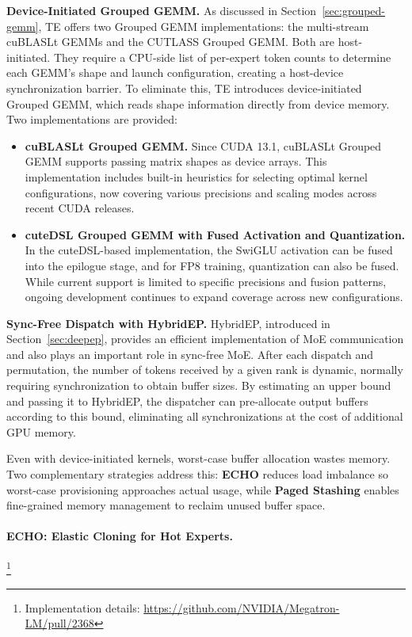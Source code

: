 \textbf{Device-Initiated Grouped GEMM.}
As discussed in Section~\ref{sec:grouped-gemm}, TE offers two Grouped GEMM implementations: the multi-stream cuBLASLt GEMMs and the CUTLASS Grouped GEMM. Both are host-initiated. They require a CPU-side list of per-expert token counts to determine each GEMM's shape and launch configuration, creating a host-device synchronization barrier. To eliminate this, TE introduces device-initiated Grouped GEMM, which reads shape information directly from device memory. Two implementations are provided:

\begin{itemize}
\item[i.] \textbf{cuBLASLt Grouped GEMM.}
Since CUDA 13.1, cuBLASLt Grouped GEMM supports passing matrix shapes as device arrays. This implementation includes built-in heuristics for selecting optimal kernel configurations, now covering various precisions and scaling modes across recent CUDA releases.

\item[ii.] \textbf{cuteDSL Grouped GEMM with Fused Activation and Quantization.}
In the cuteDSL-based implementation, the SwiGLU activation can be fused into the epilogue stage, and for FP8 training, quantization can also be fused. While current support is limited to specific precisions and fusion patterns, ongoing development continues to expand coverage across new configurations.
\end{itemize}

\textbf{Sync-Free Dispatch with HybridEP.}
HybridEP, introduced in Section~\ref{sec:deepep}, provides an efficient implementation of MoE communication and also plays an important role in sync-free MoE. After each dispatch and permutation, the number of tokens received by a given rank is dynamic, normally requiring synchronization to obtain buffer sizes. By estimating an upper bound and passing it to HybridEP, the dispatcher can pre-allocate output buffers according to this bound, eliminating all synchronizations at the cost of additional GPU memory.

Even with device-initiated kernels, worst-case buffer allocation wastes memory. Two complementary strategies address this: \textbf{ECHO} reduces load imbalance so worst-case provisioning approaches actual usage, while \textbf{Paged Stashing} enables fine-grained memory management to reclaim unused buffer space.

\paragraph{ECHO: Elastic Cloning for Hot Experts.}\label{sec:echo}\footnote{Implementation details: \url{https://github.com/NVIDIA/Megatron-LM/pull/2368}}

